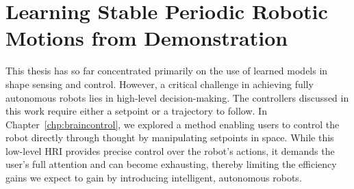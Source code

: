 \chapter{Learning Stable Periodic Robotic Motions from Demonstration}
\label{chp:osmp}

\begin{foreword}
    This thesis has so far concentrated primarily on the use of learned models in shape sensing and control. However, a critical challenge in achieving fully autonomous robots lies in high-level decision-making. The controllers discussed in this work require either a setpoint or a trajectory to follow. In Chapter~\ref{chp:braincontrol}, we explored a method enabling users to control the robot directly through thought by manipulating setpoints in space. While this low-level \gls{HRI} provides precise control over the robot’s actions, it demands the user’s full attention and can become exhausting, thereby limiting the efficiency gains we expect to gain by introducing intelligent, autonomous robots.

\end{foreword}
